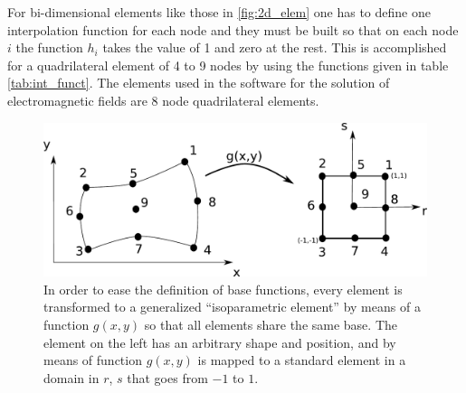 For bi-dimensional elements like those in \ref{fig:2d_elem} one has to define one interpolation function for each node and they must be built so that on each node $i$ the function $h_i$ takes the value of 1 and zero at the rest. This is accomplished for a quadrilateral element of 4 to 9 nodes by using the functions given in table \ref{tab:int_funct}. The elements used in the software for the solution of electromagnetic fields are 8 node quadrilateral elements.
\begin{figure}
\centering
\includegraphics[scale=0.5]{./img/2D_gen_elem.pdf}
\caption{In order to ease the definition of base functions, every element is transformed to a generalized ``isoparametric element'' by means of a function $g(x,y)$ \cite{Bathe1996} so that all elements share the same base. The element on the left has an arbitrary shape and position, and by means of function $g(x,y)$ is mapped to a standard element in a domain in $r$, $s$ that goes from $-1$ to $1$. }
\end{figure}

